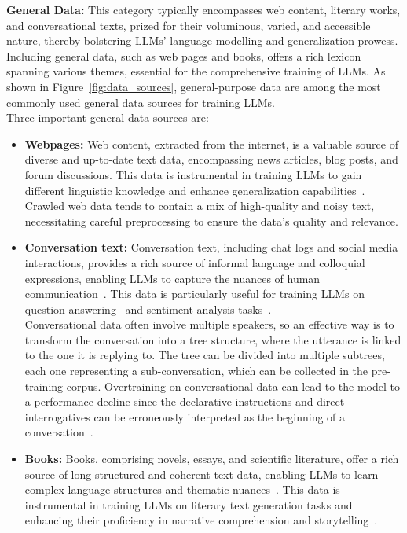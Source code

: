 \textbf{General Data:} This category typically encompasses web content, literary works, and conversational texts, prized for their voluminous, varied, and accessible nature, thereby bolstering LLMs' language modelling and generalization prowess.
Including general data, such as web pages and books, offers a rich lexicon spanning various themes, essential for the comprehensive training of LLMs.
As shown in Figure~\ref{fig:data_sources}, general-purpose data are among the most commonly used general data sources for training LLMs.\\
Three important general data sources are:
\begin{itemize}
	\item \textbf{Webpages:} {Web content, extracted from the internet, is a valuable source of diverse and up-to-date text data, encompassing news articles, blog posts, and forum discussions. This data is instrumental in training LLMs to gain different linguistic knowledge and enhance generalization capabilities~\cite{brown2020language, raffel2023exploring}.
		      Crawled web data tends to contain a mix of high-quality and noisy text, necessitating careful preprocessing to ensure the data's quality and relevance.
	      }
	\item \textbf{Conversation text:} {
		      Conversation text, including chat logs and social media interactions, provides a rich source of informal language and colloquial expressions, enabling LLMs to capture the nuances of human communication~\cite{zhang2022opt}. This data is particularly useful for training LLMs on question answering~\cite{chowdhery2022palm} and sentiment analysis tasks~\cite{zellers2019defending}.\\
		      Conversational data often involve multiple speakers, so an effective way is to transform the conversation into a tree structure, where the utterance is linked to the one it is replying to. The tree can be divided into multiple subtrees, each one representing a sub-conversation, which can be collected in the pre-training corpus.
		      Overtraining on conversational data can lead to the model to a performance decline since the declarative instructions and direct interrogatives can be erroneously interpreted as the beginning of a conversation~\cite{zhang2022opt}.
	      }
	\item \textbf{Books:} {
		      Books, comprising novels, essays, and scientific literature, offer a rich source of long structured and coherent text data, enabling LLMs to learn complex language structures and thematic nuances~\cite{zhu2015aligning}. This data is instrumental in training LLMs on literary text generation tasks and enhancing their proficiency in narrative comprehension and storytelling~\cite{radford2019language}.
	      }
\end{itemize}

